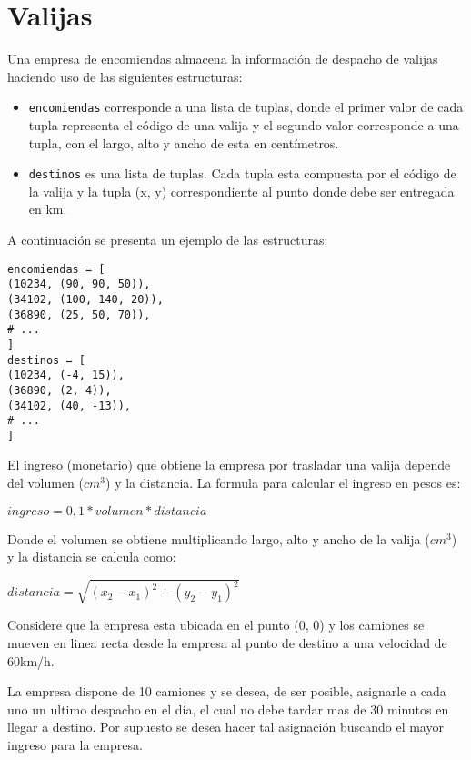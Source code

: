 \section{Valijas}

Una empresa de encomiendas almacena la información de despacho de valijas haciendo uso de las siguientes estructuras:

\begin{itemize}
    \item \texttt{encomiendas} corresponde a una lista de tuplas, donde el primer valor de cada tupla representa el código de una valija y el segundo valor corresponde a una tupla, con el largo, alto y ancho de esta en centímetros.

    \item \texttt{destinos} es una lista de tuplas. Cada tupla esta compuesta por el código de la valija y la tupla (x, y) correspondiente al punto donde debe ser entregada en km.
\end{itemize}

A continuación se presenta un ejemplo de las estructuras:

\begin{lstlisting}[style=consola]
encomiendas = [
(10234, (90, 90, 50)),
(34102, (100, 140, 20)),
(36890, (25, 50, 70)),
# ...
]
destinos = [
(10234, (-4, 15)),
(36890, (2, 4)),
(34102, (40, -13)),
# ...
]
\end{lstlisting}

El ingreso (monetario) que obtiene la empresa por trasladar una valija depende del volumen ($cm^{3}$) y la distancia. La formula para calcular el ingreso en pesos es: 

\begin{center}
    $ingreso = 0,1 * volumen * distancia$
\end{center}

Donde el volumen se obtiene multiplicando largo, alto y ancho de la valija ($cm^{3}$) y la distancia se calcula como:

\begin{center}
    $distancia = \sqrt{(x_2 - x_1)^2 + (y_2 - y_1)^2}$
\end{center}

Considere que la empresa esta ubicada en el punto (0, 0) y los camiones se mueven en linea recta desde la empresa al punto de destino a una velocidad de 60km/h.

La empresa dispone de 10 camiones y se desea, de ser posible, asignarle a cada uno un ultimo despacho en el día, el cual no debe tardar mas de 30 minutos en llegar a destino. Por supuesto se desea hacer tal asignación buscando el mayor ingreso para la empresa. 

